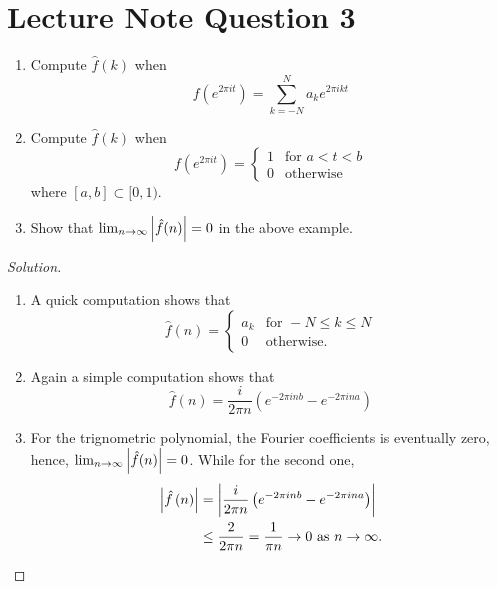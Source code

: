 \section{Lecture Note Question 3}
\horz
\begin{enumerate}
\item Compute $\hat{f} \left( k \right)$ when 
\begin{equation*}
f(e^{2\pi i t}) = \sum_{k=-N}^{N} a_{k} e^{2\pi i k t}
\end{equation*}
\item Compute $\hat{f} \left( k \right)$ when 
\begin{equation*}
f(e^{2\pi i t}) = 
\begin{cases}
1 & \text{for } a<t<b \\
0 & \text{otherwise}
\end{cases}
\end{equation*}
where $[a,b] \subset [0,1)$.
\item Show that $\lim_{n\to \infty} \left\lvert \hat{f} (n) \right\rvert = 0$ in the above example. 

\end{enumerate}

\horz

\begin{proof}[Solution]
\begin{enumerate}
\item A quick computation shows that 
\begin{equation*}
\hat{f} (n) = \begin{cases}
a_{k} & \text{for } -N \le k \le N \\
0 & \text{otherwise}.
\end{cases}
\end{equation*}
\item Again a simple computation shows that
\begin{equation*}
\hat{f} (n) = \frac{i}{2\pi n} \left( e^{-2\pi inb} - e^{-2\pi i n a} \right)
\end{equation*}
\item For the trignometric polynomial, the Fourier coefficients is eventually zero, hence, $\lim_{n\to \infty} \left\lvert \hat{f} (n) \right\rvert = 0$. While for the second one, 
\begin{align*}
\left\lvert \hat{f} \left( n \right) \right\rvert &= \left\lvert \frac{i}{2\pi n} \left( e^{-2\pi inb} - e^{-2\pi i n a} \right) \right\rvert \\
& \le \frac{2}{2\pi n} = \frac{1}{\pi n} \to 0 \text { as } n \to \infty.
\end{align*}
\end{enumerate}
\end{proof}
